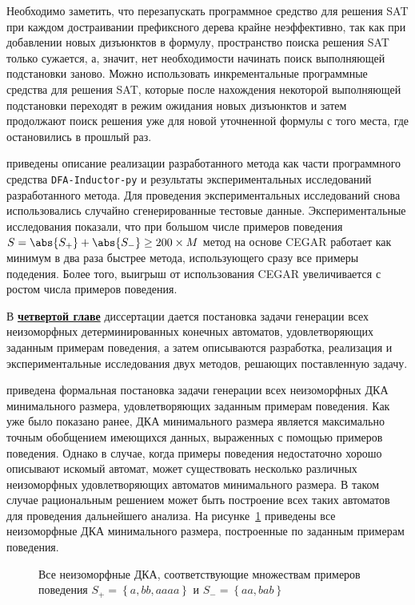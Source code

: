 Необходимо заметить, что перезапускать программное средство для решения SAT при каждом достраивании префиксного дерева крайне неэффективно, так как при добавлении новых дизъюнктов в формулу, пространство поиска решения SAT только сужается, а, значит, нет необходимости начинать поиск выполняющей подстановки заново.
Можно использовать инкрементальные программные средства для решения SAT, которые после нахождения некоторой выполняющей подстановки переходят в режим ожидания новых дизъюнктов и затем продолжают поиск решения уже для новой уточненной формулы с того места, где остановились в прошлый раз.

\insection{\ref{sec:cegar:results}} приведены описание реализации разработанного метода как части программного средства \texttt{DFA-Inductor-py} и результаты экспериментальных исследований разработанного метода. 
Для проведения экспериментальных исследований снова использовались случайно сгенерированные тестовые данные.
Экспериментальные исследования показали, что при большом числе примеров поведения $S=\abs{S_{+}}+\abs{S_{-}} \geq 200 \times M$ метод на основе CEGAR работает как минимум в два раза быстрее метода, использующего сразу все примеры подедения.
Более того, выигрыш от использования CEGAR увеличивается с ростом числа примеров поведения.


В \textbf{\underline{четвертой главе}} диссертации дается постановка задачи генерации всех неизоморфных детерминированных конечных автоматов, удовлетворяющих заданным примерам поведения, а затем описываются разработка, реализация и экспериментальные исследования двух методов, решающих поставленную задачу. 

\insection{\ref{sec:findall:problem}} приведена формальная постановка задачи генерации всех неизоморфных ДКА минимального размера, удовлетворяющих заданным примерам поведения.
Как уже было показано ранее, ДКА минимального размера является максимально точным обобщением имеющихся данных, выраженных с помощью примеров поведения.
Однако в случае, когда примеры поведения недостаточно хорошо описывают искомый автомат, может существовать несколько различных неизоморфных удовлетворяющих автоматов минимального размера.
В таком случае рациональным решением может быть построение всех таких автоматов для проведения дальнейшего анализа.
На рисунке~\ref{syn:img:find-all} приведены все неизоморфные ДКА минимального размера, построенные по заданным примерам поведения.
%
\begin{figure}[ht]
  \centering
  \ifafour
    
  \else
    
  \fi
  \caption{Все неизоморфные ДКА, соответствующие множествам примеров поведения $S_{+} = \left\{a, bb, aaaa\right\}$ и $S_{-}=\left\{aa, bab\right\}$}
  \label{syn:img:find-all}
\end{figure}

